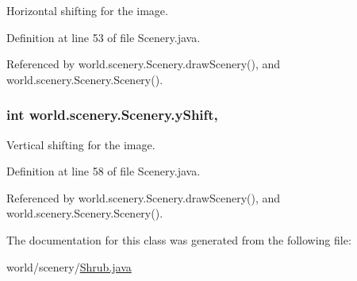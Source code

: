 Horizontal shifting for the image. 



Definition at line 53 of file Scenery.\-java.



Referenced by world.\-scenery.\-Scenery.\-draw\-Scenery(), and world.\-scenery.\-Scenery.\-Scenery().

\hypertarget{a00024_ac9ca2c17cf6920deffe490c013b0e638}{
\subsubsection[{y\-Shift}]{\setlength{\rightskip}{0pt plus 5cm}int world.\-scenery.\-Scenery.\-y\-Shift\hspace{0.3cm}{\ttfamily [protected]}, {\ttfamily [inherited]}}}\label{a00024_ac9ca2c17cf6920deffe490c013b0e638}


Vertical shifting for the image. 



Definition at line 58 of file Scenery.\-java.



Referenced by world.\-scenery.\-Scenery.\-draw\-Scenery(), and world.\-scenery.\-Scenery.\-Scenery().



The documentation for this class was generated from the following file\-:\begin{DoxyCompactItemize}
\item 
world/scenery/\hyperlink{a00072}{Shrub.\-java}\end{DoxyCompactItemize}
